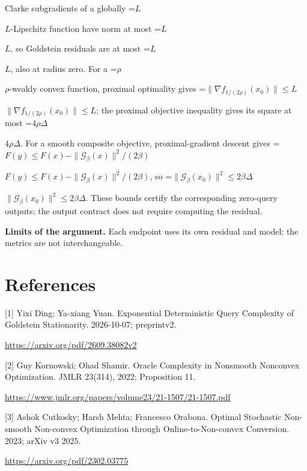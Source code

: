 \documentclass[10pt,a4paper]{article}
\newcommand{\AtlasMath}[1]{\par\begingroup\centering\setbox0=\hbox{$\displaystyle #1$}\ifdim\wd0>1.4\linewidth\typeout{ATLAS WIDE FORMULA: \the\wd0}\fi\ifdim\wd0>\linewidth\resizebox{\linewidth}{!}{\box0}\else\box0\fi\par\endgroup}
\newcommand{\AtlasInlineMath}[1]{\begingroup\setbox0=\hbox{$#1$}\ifdim\wd0>.4\linewidth\endgroup\AtlasMath{#1}\else\endgroup$#1$\fi}
\begin{document}
Clarke subgradients of a globally \AtlasInlineMath{L}-Lipschitz function have norm at most \AtlasInlineMath{L}, so Goldstein residuals are at most \AtlasInlineMath{L}, also at radius zero. For a \AtlasInlineMath{\rho}-weakly convex function, proximal optimality gives
\AtlasInlineMath{\|\nabla f_{1/(2\rho)}(x_0)\|\le L}; the proximal objective inequality gives its square at most \AtlasInlineMath{4\rho\Delta}.
For a smooth composite objective, proximal-gradient descent gives
\AtlasInlineMath{F(y)\le F(x)-\|\mathcal G_\beta(x)\|^2/(2\beta)},
so \AtlasInlineMath{\|\mathcal G_\beta(x_0)\|^2\le2\beta\Delta}.
These bounds certify the corresponding zero-query outputs; the output contract does not require computing the residual.

\textbf{Limits of the argument.} Each endpoint uses its own residual and model; the metrics are not interchangeable.

\section{References}
[1] Yixi Ding; Ya-xiang Yuan. Exponential Deterministic Query Complexity of Goldstein Stationarity. 2026-10-07; preprintv2.

\url{https://arxiv.org/pdf/2609.38082v2}

[2] Guy Kornowski; Ohad Shamir. Oracle Complexity in Nonsmooth Nonconvex Optimization. JMLR 23(314), 2022; Proposition 11.

\url{https://www.jmlr.org/papers/volume23/21-1507/21-1507.pdf}

[3] Ashok Cutkosky; Harsh Mehta; Francesco Orabona. Optimal Stochastic Non-smooth Non-convex Optimization through Online-to-Non-convex Conversion. 2023; arXiv v3 2025.

\url{https://arxiv.org/pdf/2302.03775}
\end{document}

